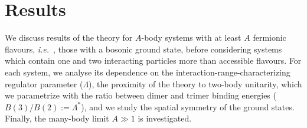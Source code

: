 \documentclass[preprint,12pt]{elsarticle}
\newcommand{\ie}{\textit{i.e.}~}
\begin{document}





\section{Results}

We discuss results of the theory for $A$-body systems with at least $A$ fermionic
flavours, \ie, those with a bosonic ground state, before considering systems
which contain one and two interacting particles more than accessible flavours.
For each system, we analyse its dependence on the interaction-range-characterizing
regulator parameter ($\Lambda$), the proximity of the theory to two-body unitarity, which we parametrize with the ratio between dimer and trimer binding energies
($B(3)/B(2):=\Lambda^*$), and we study the spatial symmetry of the ground states.
Finally, the many-body limit $A\gg1$ is investigated.
\end{document}
